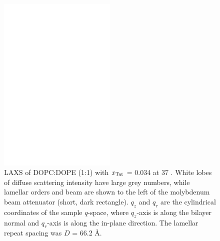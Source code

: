 \begin{figure}[htbp]
  \centering
  \includegraphics[width=0.5\textwidth]{figures/Tat/NFIT_results/dopcdope1to1}
  \caption{LAXS of DOPC:DOPE (1:1) with $x_\textrm{Tat}$ = 0.034 at 37 \textcelsius. 
  White lobes of diffuse scattering intensity have large grey numbers, while
  lamellar orders and beam are shown to the left of the
  molybdenum beam attenuator (short, dark rectangle). $q_z$ and $q_r$ are the 
  cylindrical coordinates of the sample $q$-space, where $q_z$-axis is along 
  the bilayer normal and $q_r$-axis is along the in-plane direction. 
  The lamellar repeat spacing was $D$ = 66.2 \AA.}
  \label{fig:figure1}
\end{figure}

